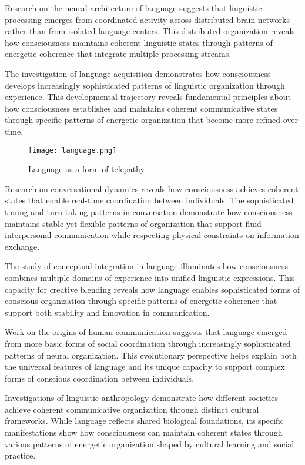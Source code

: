 Research on the neural architecture of language \cite{Pulvermuller2002} suggests that linguistic processing emerges from coordinated activity across distributed brain networks rather than from isolated language centers. This distributed organization reveals how consciousness maintains coherent linguistic states through patterns of energetic coherence that integrate multiple processing streams.

The investigation of language acquisition \cite{Tomasello2008} demonstrates how consciousness develops increasingly sophisticated patterns of linguistic organization through experience. This developmental trajectory reveals fundamental principles about how consciousness establishes and maintains coherent communicative states through specific patterns of energetic organization that become more refined over time.

\begin{figure}[h]
    \centering
    \texttt{[image: language.png]}

    \caption{Language as a form of telepathy}
\end{figure}

Research on conversational dynamics \cite{Enfield2017} reveals how consciousness achieves coherent states that enable real-time coordination between individuals. The sophisticated timing and turn-taking patterns in conversation demonstrate how consciousness maintains stable yet flexible patterns of organization that support fluid interpersonal communication while respecting physical constraints on information exchange.

The study of conceptual integration in language \cite{Fauconnier2002} illuminates how consciousness combines multiple domains of experience into unified linguistic expressions. This capacity for creative blending reveals how language enables sophisticated forms of conscious organization through specific patterns of energetic coherence that support both stability and innovation in communication.

Work on the origins of human communication \cite{Tomasello2008} suggests that language emerged from more basic forms of social coordination through increasingly sophisticated patterns of neural organization. This evolutionary perspective helps explain both the universal features of language and its unique capacity to support complex forms of conscious coordination between individuals.

Investigations of linguistic anthropology \cite{Silverstein1976} demonstrate how different societies achieve coherent communicative organization through distinct cultural frameworks. While language reflects shared biological foundations, its specific manifestations show how consciousness can maintain coherent states through various patterns of energetic organization shaped by cultural learning and social practice.

